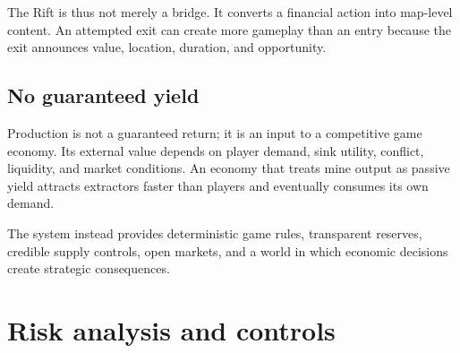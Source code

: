 \documentclass[11pt]{article}
\begin{document}
The Rift is thus not merely a bridge. It converts a financial action into map-level content. An attempted exit can create more gameplay than an entry because the exit announces value, location, duration, and opportunity.

\subsection{No guaranteed yield}

Production is not a guaranteed return; it is an input to a competitive game economy. Its external value depends on player demand, sink utility, conflict, liquidity, and market conditions. An economy that treats mine output as passive yield attracts extractors faster than players and eventually consumes its own demand.

The system instead provides deterministic game rules, transparent reserves, credible supply controls, open markets, and a world in which economic decisions create strategic consequences.

\section{Risk analysis and controls}
\end{document}
